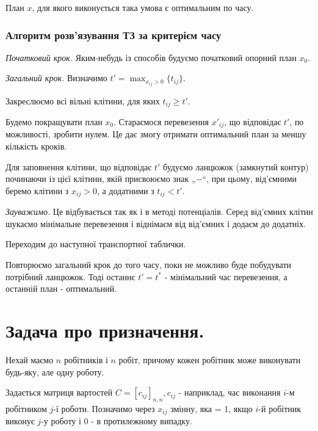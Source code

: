 \documentclass[12pt,a4paper]{report}
\newenvironment{slim_enumerate}{
\begin{enumerate}
  \setlength{\itemsep}{1pt}
  \setlength{\parskip}{0pt}
  \setlength{\parsep}{0pt}}
{\end{enumerate}}
\begin{document}
План $x$, для якого виконується така умова є оптимальним по часу.

\subsection{Алгоритм розв’язування ТЗ за критерієм часу}

\begin{slim_enumerate}
  \item {\it Початковий крок.} Яким-небудь із способів будуємо початковий опорний план $x_0$.

  \item {\it Загальний крок.} Визначимо $t'=\displaystyle\max_{x_{ij}>0}\{t_{ij}\}$.

Закреслюємо всі вільні клітини, для яких $t_{ij} \geq t'$.

Будемо покращувати план $x_0$. Стараємося перевезення $x'_{ij}$, що відповідає $t'$, по можливості, зробити нулем. Це дає змогу отримати оптимальний план за меншу кількість кроків.

Для заповнення клітини, що відповідає $t'$ будуємо ланцюжок (замкнутий контур) починаючи із цієї клітини, якій присвоюємо знак „$-$“, при цьому, від’ємними беремо клітини з $x_{ij}>0$, а додатними з $t_{ij}<t'$.

{\it Зауважимо.} Це відбувається так як і в методі потенціалів. Серед від’ємних клітин шукаємо мінімальне перевезення і віднімаєм від від’ємних і додаєм до додатніх.

Переходим до наступної транспортної таблички.

Повторюємо загальний крок до того часу, поки не можливо буде побудувати потрібний ланцюжок. Тоді останнє $t'=t^*$ - мінімальний час перевезення, а останній план - оптимальний.
\end{slim_enumerate}

\clearpage

\chapter{Задача про призначення.}

Нехай маємо $n$ робітників і $n$ робіт, причому кожен робітник може виконувати будь-яку, але одну роботу.

Задається матриця вартостей $C=[c_{ij}]_{n,n}, c_{ij}$ - наприклад, час виконання $i$-м робітником $j$-ї роботи. Позначимо через $x_{ij}$ змінну, яка = 1, якщо $i$-й робітник виконує $j$-у роботу і 0 - в протилежному випадку.
\end{document}

